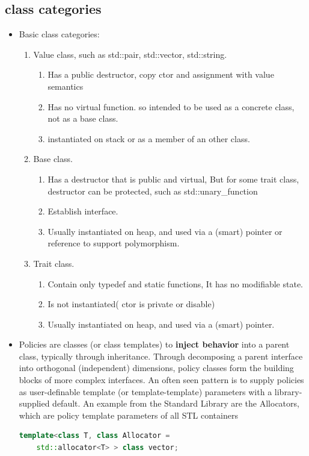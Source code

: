 \documentclass[a4paper,11pt,twoside]{book}
\begin{document}
\subsection{class categories}
\begin{itemize}
	\item Basic class categories:
	\begin{enumerate}
		\item Value class, such as std::pair, std::vector, std::string.
		\begin{enumerate}
			\item Has a public destructor, copy ctor and assignment with value semantics
			\item Has no virtual function. so intended to be used as a concrete class, not as a base class.
			\item instantiated on stack or as a member of an other class.
		\end{enumerate}
		
		\item Base class.
		\begin{enumerate}
			\item Has a destructor that is public and virtual, But for some trait class, destructor can be protected, such as std::unary\_function
			\item Establish interface.
			\item Usually instantiated on heap, and used via a (smart) pointer or reference to support polymorphism.
		\end{enumerate}
		
		\item Trait class.
		\begin{enumerate}
			\item Contain only typedef and static functions, It has no modifiable state.
			\item Is not instantiated( ctor is private or disable)
			\item Usually instantiated on heap, and used via a (smart) pointer.
		\end{enumerate}
	\end{enumerate}
	
	\item Policies are classes (or class templates) to \textbf{inject behavior} into a parent class, typically through inheritance. Through decomposing a parent interface into orthogonal (independent) dimensions, policy classes form the building blocks of more complex interfaces. An often seen pattern is to supply policies as user-definable template (or template-template) parameters with a library-supplied default. An example from the Standard Library are the Allocators, which are policy template parameters of all STL containers
\begin{lstlisting}[frame=single, language=c++]
template<class T, class Allocator =
	std::allocator<T> > class vector;
\end{lstlisting}
	

\end{itemize}
\end{document}
